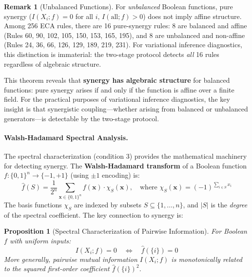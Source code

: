 \documentclass[10pt]{article} %
\theoremstyle{plain}
\newtheorem{proposition}[theorem]{Proposition}
\theoremstyle{definition}
\newtheorem{remark}[theorem]{Remark}
\begin{document}
\begin{remark}[Unbalanced Functions]
For \emph{unbalanced} Boolean functions, pure synergy ($I(X_i; f) = 0$ for all $i$, $I(\text{all}; f) > 0$) does not imply affine structure. Among 256 ECA rules, there are 16 pure-synergy rules: 8 are balanced and affine (Rules 60, 90, 102, 105, 150, 153, 165, 195), and 8 are unbalanced and non-affine (Rules 24, 36, 66, 126, 129, 189, 219, 231). For variational inference diagnostics, this distinction is immaterial: the two-stage protocol detects \emph{all} 16 rules regardless of algebraic structure.
\end{remark}

This theorem reveals that \textbf{synergy has algebraic structure} for balanced functions: pure synergy arises if and only if the function is affine over a finite field. For the practical purposes of variational inference diagnostics, the key insight is that synergistic coupling---whether arising from balanced or unbalanced generators---is detectable by the two-stage protocol.

\paragraph{Walsh-Hadamard Spectral Analysis.} The spectral characterization (condition 3) provides the mathematical machinery for detecting synergy. The \textbf{Walsh-Hadamard transform} of a Boolean function $f: \{0,1\}^n \to \{-1, +1\}$ (using $\pm 1$ encoding) is:
\begin{equation}
\hat{f}(S) = \frac{1}{2^n} \sum_{\mathbf{x} \in \{0,1\}^n} f(\mathbf{x}) \cdot \chi_S(\mathbf{x}), \quad \text{where } \chi_S(\mathbf{x}) = (-1)^{\sum_{i \in S} x_i}
\end{equation}
The basis functions $\chi_S$ are indexed by subsets $S \subseteq \{1, \ldots, n\}$, and $|S|$ is the \emph{degree} of the spectral coefficient. The key connection to synergy is:

\begin{proposition}[Spectral Characterization of Pairwise Information]
For Boolean $f$ with uniform inputs:
\begin{equation}
I(X_i; f) = 0 \quad \Leftrightarrow \quad \hat{f}(\{i\}) = 0
\end{equation}
More generally, pairwise mutual information $I(X_i; f)$ is monotonically related to the squared first-order coefficient $\hat{f}(\{i\})^2$.
\end{proposition}
\end{document}
